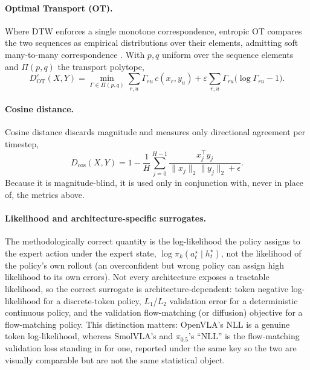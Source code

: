 \documentclass[english,12pt,a4paper,pdftex,elec,utf8]{aaltothesis}
\begin{document}
\paragraph{Optimal Transport (OT).} Where DTW enforces a single monotone correspondence, entropic OT
compares the two sequences as empirical distributions over their elements, admitting soft many-to-many
correspondence \cite{cuturi2013sinkhorn}. With $p,q$ uniform over the sequence elements and $\Pi(p,q)$
the transport polytope,
\begin{equation}
  D^{\varepsilon}_{\mathrm{OT}}(X,Y) = \min_{\Gamma\in\Pi(p,q)} \sum_{r,u}\Gamma_{ru}\,c(x_r,y_u)
    + \varepsilon\sum_{r,u}\Gamma_{ru}\big(\log\Gamma_{ru}-1\big).
  \label{eq:ot}
\end{equation}

\paragraph{Cosine distance.} Cosine distance discards magnitude and measures only directional
agreement per timestep,
\begin{equation}
  D_{\cos}(X,Y) = 1-\frac{1}{H}\sum_{j=0}^{H-1}\frac{x_j^\top y_j}{\lVert x_j\rVert_2\lVert y_j\rVert_2+\epsilon}.
  \label{eq:cos}
\end{equation}
Because it is magnitude-blind, it is used only in conjunction with, never in place of, the metrics above.

\paragraph{Likelihood and architecture-specific surrogates.} The methodologically correct quantity is
the log-likelihood the policy assigns to the expert action under the expert state,
$\log\pi_k(a^\star_t\mid h^\star_t)$, not the likelihood of the policy's own rollout (an overconfident
but wrong policy can assign high likelihood to its own errors). Not every architecture exposes a
tractable likelihood, so the correct surrogate is architecture-dependent: token negative log-likelihood
for a discrete-token policy, $L_1$/$L_2$ validation error for a deterministic continuous policy, and the
validation flow-matching (or diffusion) objective for a flow-matching policy. This distinction matters:
OpenVLA's NLL is a genuine token log-likelihood,
whereas SmolVLA's and $\pi_{0.5}$'s ``NLL'' is the flow-matching validation loss standing in for one,
reported under the same key so the two are visually comparable but are not the same statistical object.
\end{document}
